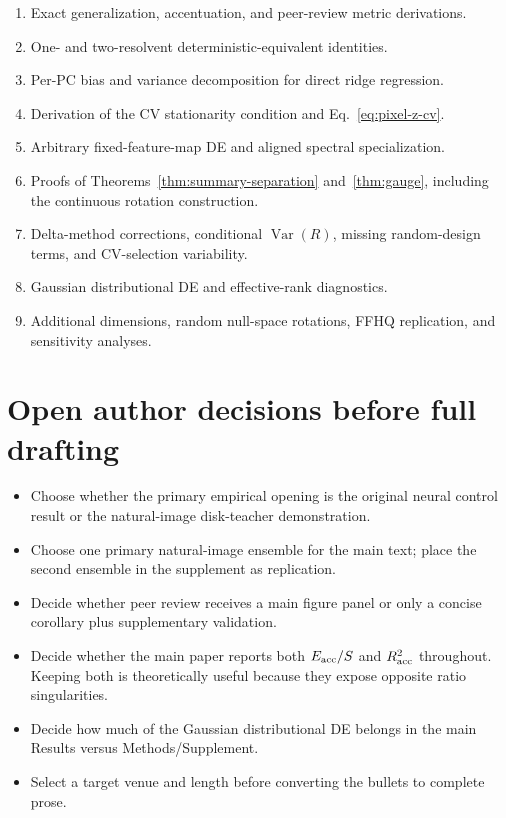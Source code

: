 \documentclass[11pt]{article}
\newcommand{\Var}{\operatorname{Var}}
\begin{document}
\begin{enumerate}
  \item Exact generalization, accentuation, and peer-review metric derivations.
  \item One- and two-resolvent deterministic-equivalent identities.
  \item Per-PC bias and variance decomposition for direct ridge regression.
  \item Derivation of the CV stationarity condition and
        Eq.~\eqref{eq:pixel-z-cv}.
  \item Arbitrary fixed-feature-map DE and aligned spectral specialization.
  \item Proofs of Theorems~\ref{thm:summary-separation} and~\ref{thm:gauge},
        including the continuous rotation construction.
  \item Delta-method corrections, conditional $\Var(R)$, missing
        random-design terms, and CV-selection variability.
  \item Gaussian distributional DE and effective-rank diagnostics.
  \item Additional dimensions, random null-space rotations, FFHQ replication,
        and sensitivity analyses.
\end{enumerate}

\section*{Open author decisions before full drafting}

\begin{itemize}
  \item Choose whether the primary empirical opening is the original neural
        control result or the natural-image disk-teacher demonstration.
  \item Choose one primary natural-image ensemble for the main text; place the
        second ensemble in the supplement as replication.
  \item Decide whether peer review receives a main figure panel or only a
        concise corollary plus supplementary validation.
  \item Decide whether the main paper reports both $E_{\rm acc}/S$ and
        $R_{\rm acc}^{2}$ throughout. Keeping both is theoretically useful
        because they expose opposite ratio singularities.
  \item Decide how much of the Gaussian distributional DE belongs in the main
        Results versus Methods/Supplement.
  \item Select a target venue and length before converting the bullets to
        complete prose.
\end{itemize}
\end{document}
